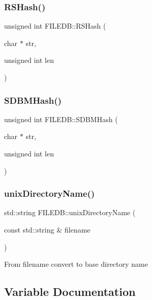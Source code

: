 \mbox{\label{namespaceFILEDB_ac69ca4109f796be06f658542b20a3eb1}} 
\subsubsection{\texorpdfstring{RSHash()}{RSHash()}}
{\footnotesize\ttfamily unsigned int F\+I\+L\+E\+D\+B\+::\+R\+S\+Hash (\begin{DoxyParamCaption}\item[{char $\ast$}]{str,  }\item[{unsigned int}]{len }\end{DoxyParamCaption})}

\mbox{\label{namespaceFILEDB_a93a0c708c1ad9c299200dbaa873c5531}} 
\subsubsection{\texorpdfstring{SDBMHash()}{SDBMHash()}}
{\footnotesize\ttfamily unsigned int F\+I\+L\+E\+D\+B\+::\+S\+D\+B\+M\+Hash (\begin{DoxyParamCaption}\item[{char $\ast$}]{str,  }\item[{unsigned int}]{len }\end{DoxyParamCaption})}

\mbox{\label{namespaceFILEDB_a7e76510d94991fb0a4e18acc02214900}} 
\subsubsection{\texorpdfstring{unixDirectoryName()}{unixDirectoryName()}}
{\footnotesize\ttfamily std\+::string F\+I\+L\+E\+D\+B\+::unix\+Directory\+Name (\begin{DoxyParamCaption}\item[{const std\+::string \&}]{filename }\end{DoxyParamCaption})}

From filename convert to base directory name 

\subsection{Variable Documentation}
\mbox{\label{namespaceFILEDB_a8a86234763af41b14f1cfcf436e8674f}} 
